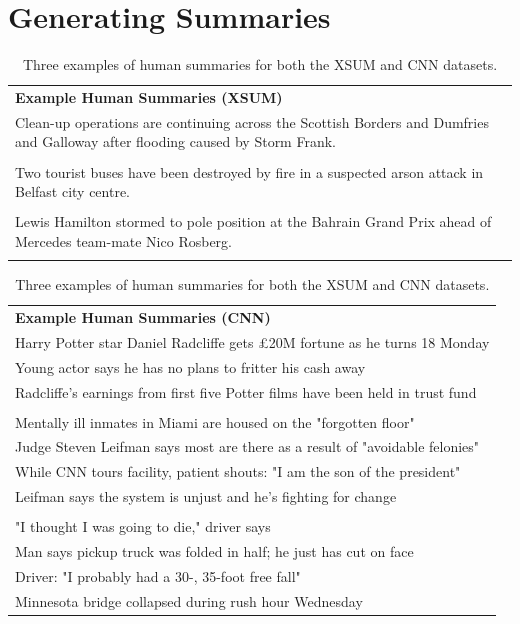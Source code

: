 \documentclass{article}
\theoremstyle{plain}
\theoremstyle{definition}
\theoremstyle{remark}
\begin{document}
\section{Generating Summaries}

\begin{table}[h!]
    \centering
    \footnotesize
    \begin{tabular}{>{\columncolor{gray!20}}p{}}
        \textbf{Example Human Summaries (XSUM)}\\
        Clean-up operations are continuing across the Scottish Borders and Dumfries and Galloway after flooding caused by Storm Frank. \\\\
        Two tourist buses have been destroyed by fire in a suspected arson attack in Belfast city centre. \\\\
        Lewis Hamilton stormed to pole position at the Bahrain Grand Prix ahead of Mercedes team-mate Nico Rosberg. \\
        \multicolumn{1}{c}{} \\ %
    \end{tabular}
    \begin{tabular}{>{\columncolor{gray!20}}p{}}
        \textbf{Example Human Summaries (CNN)}\\
        Harry Potter star Daniel Radcliffe gets £20M fortune as he turns 18 Monday \\
        Young actor says he has no plans to fritter his cash away \\
        Radcliffe's earnings from first five Potter films have been held in trust fund \\
        \\
        Mentally ill inmates in Miami are housed on the "forgotten floor" \\
        Judge Steven Leifman says most are there as a result of "avoidable felonies" \\
        While CNN tours facility, patient shouts: "I am the son of the president" \\
        Leifman says the system is unjust and he's fighting for change \\
        \\

        "I thought I was going to die," driver says \\
        Man says pickup truck was folded in half; he just has cut on face \\
        Driver: "I probably had a 30-, 35-foot free fall" \\
        Minnesota bridge collapsed during rush hour Wednesday \\
    \end{tabular}
    \caption{Three examples of human summaries for both the XSUM and CNN datasets.}
    \label{table:human_summary_examples}
\end{table}
\end{document}
